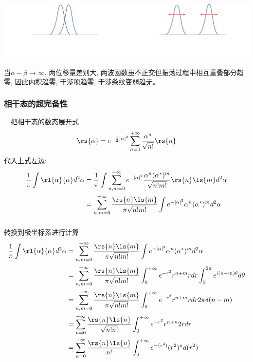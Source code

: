 \begin{frame}
 \frametitle{}
   \begin{center}
        \includegraphics[width=1.0\textwidth]{figs/11.png}
   \end{center}
 当$\alpha - \beta \to \infty $, 两位移量差别大, 两波函数虽不正交但振荡过程中相互重叠部分趋零, 因此内积趋零, 干涉项趋零, 干涉条纹变弱趋无。
 
\end{frame}

\begin{frame}
 \frametitle{相干态的超完备性}
 \例[13.试证明相干态具有如下完备性关系]{
    \[ \frac{1}{\pi} \int \rl{\alpha}{\alpha}d ^2 \alpha =1 \] }
 \证 ~ 把相干态的数态展开式
    \[\rs{\alpha} = e^{-\frac{1}{2}\left|\alpha\right|^2}  \sum_{n=0} ^{+\infty}  \frac{\alpha^n}{\sqrt{n!}} \rs{n} \]
 代入上式左边:
 \[
    \begin{aligned}
        \frac{1}{\pi} \int \rl{\alpha}{\alpha}d ^2 \alpha &=  \frac{1}{\pi} \int \sum_{n,m=0} ^{+\infty} e^{-\left|\alpha\right|^2}  
        \frac{\alpha^n(\alpha^*)^m}{\sqrt{n!m!}}  \rs{n}\ls{m }d ^2 \alpha \\
        &= \sum_{n,m=0} ^{+\infty}  \frac{\rs{n}\ls{m }}{\pi \sqrt{ n!m!}}  \int  e^{-\left|\alpha\right|^2}  \alpha^n(\alpha^*)^m  d ^2 \alpha
    \end{aligned}    
 \]    
\end{frame}

\begin{frame}
 \frametitle{}
  转换到极坐标系进行计算
  \[ 
    \begin{aligned}
        \frac{1}{\pi} \int \rl{\alpha}{\alpha}d ^2 \alpha 
        &= \sum_{n,m=0} ^{+\infty}  \frac{\rs{n}\ls{m }}{\pi \sqrt{ n!m!}}  \int  e^{-\left|\alpha\right|^2}  \alpha^n(\alpha^*)^m  d ^2 \alpha \\ 
        &= \sum_{n,m=0} ^{+\infty}  \frac{\rs{n}\ls{m }}{\pi \sqrt{ n!m!}} 
        \int _0 ^ {+\infty}  e^{-r^2}  r^{n+m}  r dr   \int _0 ^ {2 \pi} e^{i(n-m)\theta} d\theta  \\ 
        &= \sum_{n,m=0} ^{+\infty}  \frac{\rs{n}\ls{m }}{\pi \sqrt{ n!m!}} 
        \int _0 ^ {+\infty}  e^{-r^2}  r^{n+m}  r dr   2 \pi \delta(n-m)  \\ 
        &= \sum_{n=0} ^{+\infty}  \frac{\rs{n}\ls{n }}{\sqrt{ n!n!}} 
        \int _0 ^ {+\infty}  e^{-r^2}  r^{n+n}  2r dr  \\ 
        &= \sum_{n=0} ^{+\infty}  \frac{\rs{n}\ls{n }}{n!} 
        \int _0 ^ {+\infty}  e^{-(r^2)}  (r^2)^{n}   d(r^2)  
    \end{aligned}    
 \]        
\end{frame}

